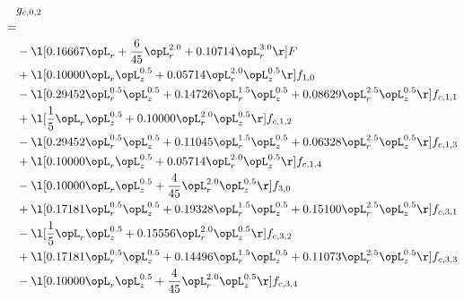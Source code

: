 \begin{alignat}{2} 
\label{eq:g_02_0} 
& g_{c,0,2} \nonumber \\ 
 = \\ 
& - \l[  0.16667 \opL_r + \frac{6}{45} \opL_r^{2.0} +  0.10714 \opL_r^{3.0}  \r] F \nonumber \\ 
& + \l[  0.10000 \opL_r \opL_z^{0.5} +  0.05714 \opL_r^{2.0} \opL_z^{0.5}  \r] f_{1,0} \nonumber \\ 
& - \l[  0.29452 \opL_r^{0.5} \opL_z^{0.5} +  0.14726 \opL_r^{1.5} \opL_z^{0.5} +  0.08629 \opL_r^{2.5} \opL_z^{0.5}  \r] f_{c,1,1} \nonumber \\ 
& + \l[ \frac{1}{5} \opL_r \opL_z^{0.5} +  0.10000 \opL_r^{2.0} \opL_z^{0.5}  \r] f_{c,1,2} \nonumber \\ 
& - \l[  0.29452 \opL_r^{0.5} \opL_z^{0.5} +  0.11045 \opL_r^{1.5} \opL_z^{0.5} +  0.06328 \opL_r^{2.5} \opL_z^{0.5}  \r] f_{c,1,3} \nonumber \\ 
& + \l[  0.10000 \opL_r \opL_z^{0.5} +  0.05714 \opL_r^{2.0} \opL_z^{0.5}  \r] f_{c,1,4} \nonumber \\ 
& - \l[  0.10000 \opL_r \opL_z^{0.5} + \frac{4}{45} \opL_r^{2.0} \opL_z^{0.5}  \r] f_{3,0} \nonumber \\ 
& + \l[  0.17181 \opL_r^{0.5} \opL_z^{0.5} +  0.19328 \opL_r^{1.5} \opL_z^{0.5} +  0.15100 \opL_r^{2.5} \opL_z^{0.5}  \r] f_{c,3,1} \nonumber \\ 
& - \l[ \frac{1}{5} \opL_r \opL_z^{0.5} +  0.15556 \opL_r^{2.0} \opL_z^{0.5}  \r] f_{c,3,2} \nonumber \\ 
& + \l[  0.17181 \opL_r^{0.5} \opL_z^{0.5} +  0.14496 \opL_r^{1.5} \opL_z^{0.5} +  0.11073 \opL_r^{2.5} \opL_z^{0.5}  \r] f_{c,3,3} \nonumber \\ 
& - \l[  0.10000 \opL_r \opL_z^{0.5} + \frac{4}{45} \opL_r^{2.0} \opL_z^{0.5}  \r] f_{c,3,4} \nonumber \\ 
\end{alignat} 


